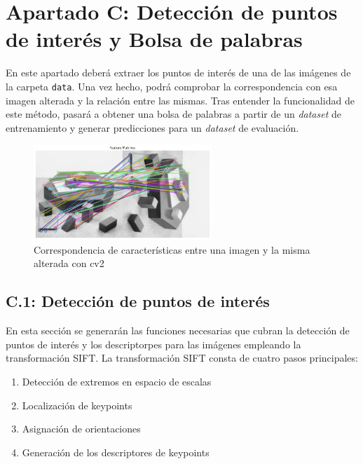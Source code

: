 \chapter{Apartado C: \textbf{Detección de puntos de interés y Bolsa de palabras}}
\label{chapter:tarea_c}

En este apartado deberá extraer los puntos de interés de una de las imágenes de la carpeta \texttt{data}. Una vez hecho, podrá comprobar la correspondencia con esa imagen alterada y la relación entre las mismas. Tras entender la funcionalidad de este método, pasará a obtener una bolsa de palabras a partir de un \textit{dataset} de entrenamiento y generar predicciones para un \textit{dataset} de evaluación.

\begin{figure}[h]
    \centering
    \includegraphics[width=0.6\textwidth]{Lab_3/template/figures/FeatureMatch.png}
    \caption{Correspondencia de características entre una imagen y la misma alterada con cv2}
    \label{fig:feat_match}
\end{figure}



\section*{C.1: Detección de puntos de interés}
{}

En esta sección se generarán las funciones necesarias que cubran la detección de puntos de interés y los descriptorpes para las imágenes empleando la transformación SIFT.
La transformación SIFT consta de cuatro pasos principales:

\begin{enumerate}
    \item Detección de extremos en espacio de escalas
    \item Localización de keypoints
    \item Asignación de orientaciones
    \item Generación de los descriptores de keypoints
\end{enumerate}

